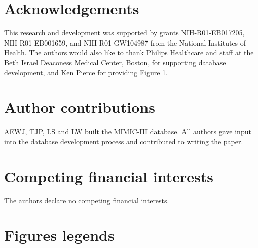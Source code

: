 \documentclass[english]{article}
\begin{document}



\section*{Acknowledgements}


This research and development was supported by grants NIH-R01-EB017205, NIH-R01-EB001659, and NIH-R01-GW104987 from the National Institutes of Health. The authors would also like to thank Philips Healthcare and staff at the Beth Israel Deaconess Medical Center, Boston, for supporting database development, and Ken Pierce for providing Figure 1.

\section*{Author contributions}

AEWJ, TJP, LS and LW built the MIMIC-III database. All authors gave input into the database development process and contributed to writing the paper. 

\section*{Competing financial interests}

The authors declare no competing financial interests.

\section*{Figures legends}

\end{document}
